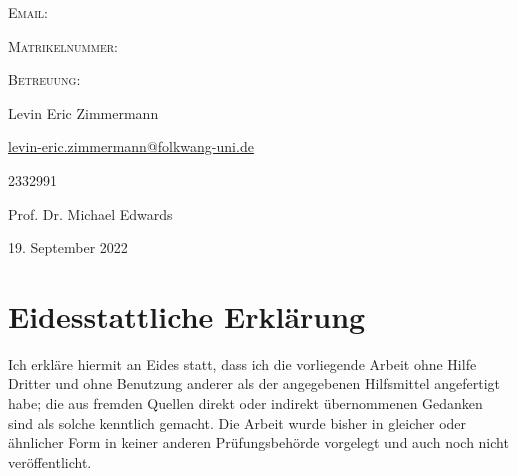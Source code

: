 \documentclass[12pt,a4paper,ngerman]{article}
\newcommand{\mailto}[1]{\href{mailto:#1}{#1}}
\begin{document}
\begin{titlepage}
\begin{minipage}[b]{.25\textwidth}
\begin{flushleft}
\textsc{Email:}

\textsc{Matrikelnummer:}

\textsc{Betreuung:}
\end{flushleft}
\end{minipage}%
\begin{minipage}[b]{.5\textwidth}
\begin{flushleft}
Levin Eric Zimmermann %

{\normalsize \mailto{levin-eric.zimmermann@folkwang-uni.de}}

2332991

Prof. Dr. Michael Edwards
\end{flushleft}
\end{minipage}

\vspace{2cm}



{\large 19. September 2022}\\[2cm] %

\vfill %

\end{titlepage}




\newpage


\section*{Eidesstattliche Erklärung}

Ich erkläre hiermit an Eides statt, dass ich die vorliegende Arbeit ohne Hilfe Dritter und ohne Benutzung anderer als der angegebenen
Hilfsmittel angefertigt habe; die aus fremden Quellen direkt oder
indirekt übernommenen Gedanken sind als solche kenntlich gemacht. Die
Arbeit wurde bisher in gleicher oder ähnlicher Form in keiner anderen
Prüfungsbehörde vorgelegt und auch noch nicht veröffentlicht.
\end{document}

